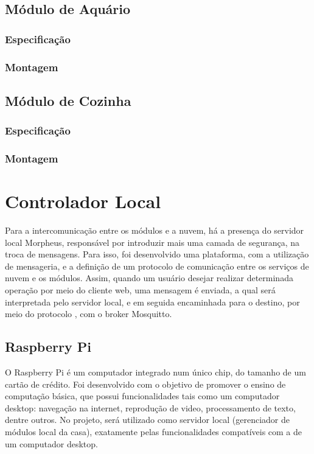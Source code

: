 \subsection{Módulo de Aquário}
\subsubsection{Especificação}
\subsubsection{Montagem}

\subsection{Módulo de Cozinha}
\subsubsection{Especificação}
\subsubsection{Montagem}

\section{Controlador Local}
Para a intercomunicação entre os módulos e a nuvem, há a presença do servidor local Morpheus, responsável por introduzir mais uma camada de segurança, na troca de mensagens. Para isso, foi desenvolvido uma plataforma, com a utilização de mensageria, e a definição de um protocolo de comunicação entre os serviços de nuvem e os módulos. Assim, quando um usuário desejar realizar determinada operação por meio do cliente web, uma mensagem é enviada, a qual será interpretada pelo servidor local, e em seguida encaminhada para o destino, por meio do protocolo \wmqtt, com o broker Mosquitto.

\subsection{Raspberry Pi}
O Raspberry Pi é um computador integrado num único chip, do tamanho de um cartão de crédito. Foi desenvolvido com o objetivo de promover o ensino de computação básica, que possui funcionalidades tais como um computador desktop: navegação na internet, reprodução de video, processamento de texto, dentre outros. No projeto, será utilizado como servidor local (gerenciador de módulos local da casa), exatamente pelas funcionalidades compatíveis com a de um computador desktop.

